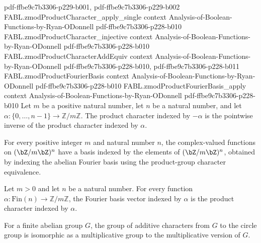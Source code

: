 \begin{theorem}
  {pdf-ffbe9c7b3306-p229-b001,
    pdf-ffbe9c7b3306-p229-b002}
\proofstep
  {FABL.zmodProductCharacter_apply_single}
  {context}
  {Analysis-of-Boolean-Functions-by-Ryan-ODonnell}
  {pdf-ffbe9c7b3306-p228-b010}
\proofstep
  {FABL.zmodProductCharacter_injective}
  {context}
  {Analysis-of-Boolean-Functions-by-Ryan-ODonnell}
  {pdf-ffbe9c7b3306-p228-b010}
\proofstep
  {FABL.zmodProductCharacterAddEquiv}
  {context}
  {Analysis-of-Boolean-Functions-by-Ryan-ODonnell}
  {pdf-ffbe9c7b3306-p228-b010,
    pdf-ffbe9c7b3306-p228-b011}
\proofstep
  {FABL.zmodProductFourierBasis}
  {context}
  {Analysis-of-Boolean-Functions-by-Ryan-ODonnell}
  {pdf-ffbe9c7b3306-p228-b010}
\proofstep
  {FABL.zmodProductFourierBasis_apply}
  {context}
  {Analysis-of-Boolean-Functions-by-Ryan-ODonnell}
  {pdf-ffbe9c7b3306-p228-b010}
Let $m$ be a positive natural number, let $n$ be a natural number, and let
$\alpha\colon\{0,\ldots,n-1\}\to\mathbb Z/m\mathbb Z$. The product character indexed by
$-\alpha$ is the pointwise inverse of the product character indexed by $\alpha$.
\end{theorem}

\begin{definition}
\label{FABL.zmodProductFourierBasis}
\leanok
{}
For every positive integer $m$ and natural number $n$, the complex-valued functions on
$(\bZ/m\bZ)^n$ have a basis indexed by the elements of $(\bZ/m\bZ)^n$, obtained by indexing
the abelian Fourier basis using the product-group character equivalence.
\end{definition}

\begin{theorem}
\label{FABL.zmodProductFourierBasis_apply}
\leanok
{}
Let $m>0$ and let $n$ be a natural number. For every function
$\alpha\colon\mathrm{Fin}(n)\to\mathbb Z/m\mathbb Z$, the Fourier basis vector indexed
by $\alpha$ is the product character indexed by $\alpha$.
\end{theorem}

\begin{definition}
\label{FABL.circleCharacterMulEquiv}
\leanok
For a finite abelian group $G$, the group of additive characters from $G$ to the circle
group is isomorphic as a multiplicative group to the multiplicative version of $G$.
\end{definition}

